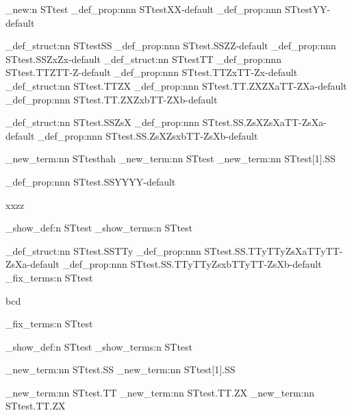 \documentclass[dctools,english]{ufrgscca}
\begin{document}
\ExplSyntaxOn

\starray_new:n {STtest}
\starray_def_prop:nnn {STtest}{X}{X-default}
\starray_def_prop:nnn {STtest}{Y}{Y-default}

\starray_def_struct:nn {STtest}{SS}
\starray_def_prop:nnn {STtest.SS}{Z}{Z-default}
\starray_def_prop:nnn {STtest.SS}{Zx}{Zx-default}
\starray_def_struct:nn {STtest}{TT}
\starray_def_prop:nnn {STtest.TT}{Z}{TT-Z-default}
\starray_def_prop:nnn {STtest.TT}{Zx}{TT-Zx-default}
\starray_def_struct:nn {STtest.TT}{ZX}
\starray_def_prop:nnn {STtest.TT.ZX}{ZXa}{TT-ZXa-default}
\starray_def_prop:nnn {STtest.TT.ZX}{Zxb}{TT-ZXb-default}

\starray_def_struct:nn {STtest.SS}{ZsX}
\starray_def_prop:nnn {STtest.SS.ZsX}{ZsXa}{TT-ZsXa-default}
\starray_def_prop:nnn {STtest.SS.ZsX}{Zsxb}{TT-ZsXb-default}



\starray_new_term:nn {STtest}{hah}
\starray_new_term:nn {STtest}{}
\starray_new_term:nn {STtest[1].SS}{}

\starray_def_prop:nnn {STtest.SS}{YY}{YY-default}


xxzz\par

\starray_show_def:n {STtest}
\starray_show_terms:n {STtest}

\starray_def_struct:nn {STtest.SS}{TTy}
\starray_def_prop:nnn {STtest.SS.TTy}{TTyZsXa}{TTyTT-ZsXa-default}
\starray_def_prop:nnn {STtest.SS.TTy}{TTyZsxb}{TTyTT-ZsXb-default}
\starray_fix_terms:n {STtest}


bcd\par
\starray_fix_terms:n {STtest}

\starray_show_def:n {STtest}
\starray_show_terms:n {STtest}


        \starray_new_term:nn {STtest.SS}{}
        \starray_new_term:nn {STtest[1].SS}{}


        \starray_new_term:nn {STtest.TT}{}
        \starray_new_term:nn {STtest.TT.ZX}{}
        \starray_new_term:nn {STtest.TT.ZX}{}

\end{document}
